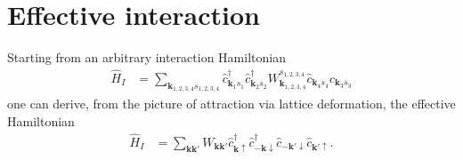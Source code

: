 \documentclass[english, parskip=full]{scrartcl}
\begin{document}
\section{Effective interaction}
Starting from an arbitrary interaction Hamiltonian
\begin{align}
\hat{H}_I &= \sum_{\mathbf{k}_{1,2,3,4}s_{1,2,3,4}} \hat{c}_{\mathbf{k}_1s_1}^\dagger \hat{c}_{\mathbf{k}_2s_2}^\dagger W_{\mathbf{k}_{1,2,3,4}}^{s_{1,2,3,4}} \hat{c}_{\mathbf{k}_4s_4} \hat{c}_{\mathbf{k}_3s_3}
\end{align}
one can derive, from the picture of attraction via lattice deformation, the effective Hamiltonian
\begin{align}
\hat{H}_I &= \sum_{\mathbf{k}\mathbf{k}'} W_{\mathbf{k}\mathbf{k}'} \hat{c}_{\mathbf{k}\uparrow}^\dagger \hat{c}_{-\mathbf{k}\downarrow}^\dagger \hat{c}_{-\mathbf{k}'\downarrow} \hat{c}_{\mathbf{k}'\uparrow} .
\end{align}
\end{document}
